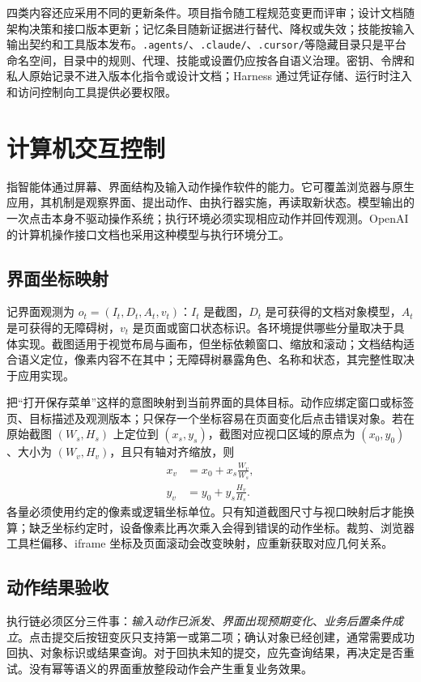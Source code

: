 \documentclass[../textbook.tex]{subfiles}
\begin{document}
四类内容还应采用不同的更新条件。项目指令随工程规范变更而评审；设计文档随架构决策和接口版本更新；记忆条目随新证据进行替代、降权或失效；技能按输入输出契约和工具版本发布。\texttt{.agents/}、\texttt{.claude/}、\texttt{.cursor/}等隐藏目录只是平台命名空间，目录中的规则、代理、技能或设置仍应按各自语义治理。密钥、令牌和私人原始记录不进入版本化指令或设计文档；Harness 通过凭证存储、运行时注入和访问控制向工具提供必要权限。

\section{计算机交互控制}

\label{sec:computer-use}
指智能体通过屏幕、界面结构及输入动作操作软件的能力。它可覆盖浏览器与原生应用，其机制是观察界面、提出动作、由执行器实施，再读取新状态。模型输出的一次点击本身不驱动操作系统；执行环境必须实现相应动作并回传观测。OpenAI 的计算机操作接口文档也采用这种模型与执行环境分工。\cite{openai2026computeruse}

\subsection{界面坐标映射}
记界面观测为 $o_t=(I_t,D_t,A_t,v_t)$：$I_t$ 是截图，$D_t$ 是可获得的文档对象模型，$A_t$ 是可获得的无障碍树，$v_t$ 是页面或窗口状态标识。各环境提供哪些分量取决于具体实现。截图适用于视觉布局与画布，但坐标依赖窗口、缩放和滚动；文档结构适合语义定位，像素内容不在其中；无障碍树暴露角色、名称和状态，其完整性取决于应用实现。

把“打开保存菜单”这样的意图映射到当前界面的具体目标。动作应绑定窗口或标签页、目标描述及观测版本；只保存一个坐标容易在页面变化后点击错误对象。若在原始截图 $(W_s,H_s)$ 上定位到 $(x_s,y_s)$，截图对应视口区域的原点为 $(x_0,y_0)$、大小为 $(W_v,H_v)$，且只有轴对齐缩放，则
\begin{equation}
 \begin{aligned}
  x_v &= x_0+x_s\frac{W_v}{W_s}, \\
  y_v &= y_0+y_s\frac{H_v}{H_s}.
 \end{aligned}
\end{equation}
各量必须使用约定的像素或逻辑坐标单位。只有知道截图尺寸与视口映射后才能换算；缺乏坐标约定时，设备像素比再次乘入会得到错误的动作坐标。裁剪、浏览器工具栏偏移、iframe 坐标及页面滚动会改变映射，应重新获取对应几何关系。

\subsection{动作结果验收}
执行链必须区分三件事：\emph{输入动作已派发}、\emph{界面出现预期变化}、\emph{业务后置条件成立}。点击提交后按钮变灰只支持第一或第二项；确认对象已经创建，通常需要成功回执、对象标识或结果查询。对于回执未知的提交，应先查询结果，再决定是否重试。没有幂等语义的界面重放整段动作会产生重复业务效果。
\end{document}
